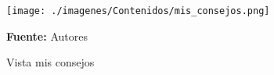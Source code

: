 \begin{figure}[!htb]
  \begin{center}
\texttt{[image: ./imagenes/Contenidos/mis\_consejos.png]}
    \caption{Vista mis consejos}
    \label{fig:Vista_mis_consejos}
    \textbf{Fuente:}  Autores
  \end{center}
\end{figure}
